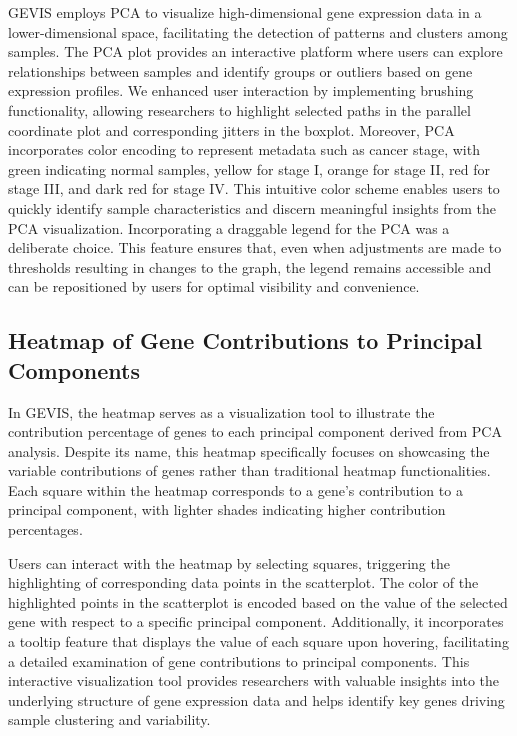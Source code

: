 \documentclass[
	a4paper, %
	10pt, %
	unnumberedsections, %
	twoside, %
]{LTJournalArticle}
\begin{document}
GEVIS employs PCA to visualize high-dimensional gene expression data in a lower-dimensional space, facilitating the detection of patterns and clusters among samples. The PCA plot provides an interactive platform where users can explore relationships between samples and identify groups or outliers based on gene expression profiles. We enhanced user interaction by implementing brushing functionality, allowing researchers to highlight selected paths in the parallel coordinate plot and corresponding jitters in the boxplot. Moreover, PCA incorporates color encoding to represent metadata such as cancer stage, with green indicating normal samples, yellow for stage I, orange for stage II, red for stage III, and dark red for stage IV. This intuitive color scheme enables users to quickly identify sample characteristics and discern meaningful insights from the PCA visualization.
Incorporating a draggable legend for the PCA was a deliberate choice. This feature ensures that, even when adjustments are made to thresholds resulting in changes to the graph, the legend remains accessible and can be repositioned by users for optimal visibility and convenience.


\subsection{Heatmap of Gene Contributions to Principal Components}

In GEVIS, the heatmap serves as a visualization tool to illustrate the contribution percentage of genes to each principal component derived from PCA analysis. Despite its name, this heatmap specifically focuses on showcasing the variable contributions of genes rather than traditional heatmap functionalities. Each square within the heatmap corresponds to a gene's contribution to a principal component, with lighter shades indicating higher contribution percentages.

Users can interact with the heatmap by selecting squares, triggering the highlighting of corresponding data points in the scatterplot. The color of the highlighted points in the scatterplot is encoded based on the value of the selected gene with respect to a specific principal component. Additionally, it incorporates a tooltip feature that displays the value of each square upon hovering, facilitating a detailed examination of gene contributions to principal components. This interactive visualization tool provides researchers with valuable insights into the underlying structure of gene expression data and helps identify key genes driving sample clustering and variability.
\end{document}
